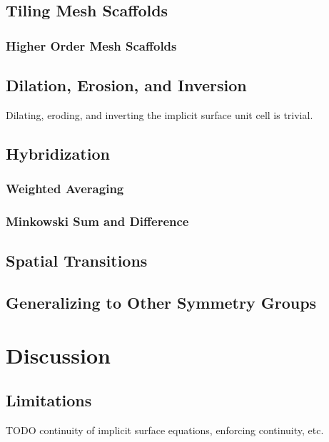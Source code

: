 \documentclass[acmtog]{acmart}
\begin{document}
\subsection{Tiling Mesh Scaffolds}
\label{sec:tiling_mesh_scaffolds}

\subsubsection{Higher Order Mesh Scaffolds}
\label{sec:higher_order_scaffolds}

\subsection{Dilation, Erosion, and Inversion}
\label{sec:dilation_erosion_inversion}

Dilating, eroding, and inverting the implicit surface unit cell is trivial.

\subsection{Hybridization}

\subsubsection{Weighted Averaging}

\subsubsection{Minkowski Sum and Difference}

\subsection{Spatial Transitions}
\label{sec:spatial_transitions}

\subsection{Generalizing to Other Symmetry Groups}

\section{Discussion}
\subsection{Limitations}
TODO continuity of implicit surface equations, enforcing continuity, etc.
\end{document}
